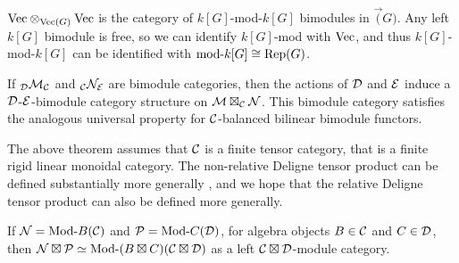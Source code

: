 \documentclass{amsart}
\begin{document}
\begin{example}
$\Vec \otimes_{\Vec(G)} \Vec$ is the category of $k[G]$-mod-$k[G]$ bimodules in $\Vec(G)$. Any left $k[G]$ bimodule is free, so we can identify $k[G]$-mod with $\Vec$, and thus $k[G]$-mod-$k[G]$ can be identified with $\text{mod-}k[G] \cong \Rep(G)$.
\end{example}

\begin{remark}
	If ${}_{\cD}\cM_{\cC}$ and ${}_{\cC}\cN_{\cE}$ are bimodule categories, then the actions of $\cD$ and $\cE$ induce a $\cD$-$\cE$-bimodule category structure on $\cM \boxtimes_{\cC} \cN$. This bimodule category satisfies the analogous universal property for $\cC$-balanced bilinear bimodule functors.
\end{remark}

\begin{remark}
The above theorem assumes that $\cC$ is a finite tensor category, that is a finite rigid linear monoidal category.  The non-relative Deligne tensor product can be defined substantially more generally \cite{1212.1545}, and we hope that the relative Deligne tensor product can also be defined more generally.
\end{remark}



\begin{lemma}%
\end{lemma}

\begin{corollary}%
\end{corollary}

\begin{proposition}
	If $\cN = \Mod{}{B}(\cC)$ and $\cP = \Mod{}{C}(\cD)$, for algebra objects $B \in \cC$ and $C \in \cD$, then $\cN \boxtimes \cP \simeq \Mod{}{(B \boxtimes C)}(\cC \boxtimes \cD)$ as a left $\cC \boxtimes \cD$-module category.
\end{proposition}
\end{document}
